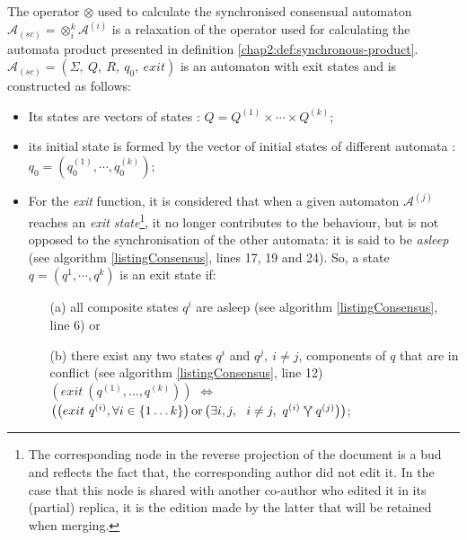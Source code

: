 The operator $\otimes$ used to calculate the synchronised consensual automaton $\mathcal{A}_{(sc)}=\otimes_{i}^{k}\mathcal{A}^{(i)}$ is a relaxation of the operator used for calculating the automata product presented in definition \ref{chap2:def:synchronous-product}. $\mathcal{A}_{(sc)} = (\Sigma, ~Q, ~R, ~q_0, ~exit)$  is an automaton with exit states and is constructed as follows:

\begin{itemize}
	\item Its states are vectors of states : $Q =Q^{(1)}\times\cdots\times Q^{(k)}$; 
	\item its initial state is formed by the vector of initial states of different automata : $q_{0}=\left(q_{0}^{(1)},\cdots, q_{0}^{(k)}\right)$;
	\item For the \textit{exit} function, it is considered that when a given automaton $\mathcal{A}^{(j)}$ reaches an \textit{exit state}\footnote{The corresponding node in the reverse projection of the document is a bud and reflects the fact that, the corresponding author did not edit it. In the case that this node is shared with another co-author who edited it  in its (partial) replica, it is the edition made by the latter that will be retained when merging.}, it no longer contributes to the behaviour, but is not opposed to the synchronisation of the other automata: it is said to be \textit{asleep} (see algorithm \ref{listingConsensus}, lines 17, 19 and 24). So, a state $q = (q^1, \cdots, q^k)$ is an exit state if: 
	\begin{itemize}
		\item[(a)] all composite states $q^i$ are asleep (see algorithm \ref{listingConsensus}, line 6) or 
		\item[(b)] there exist any two states $q^{i}$ and $q^{j}, ~i \neq j$, components of $q$ that are in conflict (see algorithm \ref{listingConsensus}, line 12)  \\
		$\left( exit~\left(q^{(1)},\ldots,q^{(k)}\right)\right)$ $\Leftrightarrow$\\
		$\left( \left( exit~q^{(i)}, \forall i \in \{1\ldots k\} \right) \mbox{or} \left( \exists i, j, ~~i\neq j,  ~ q^{(i)} \curlyveeuparrow  q^{(j)}\right) \right)$;
	\end{itemize}
	

\end{itemize}
